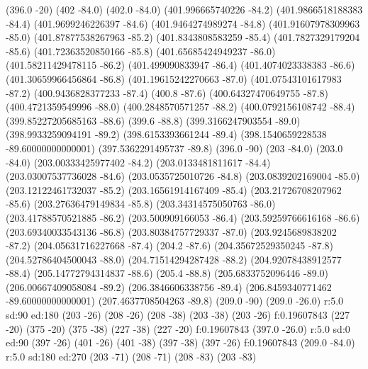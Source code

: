 {\lvec (396.0 -20)
\move (402 -84.0)
\lvec (402.0 -84.0)
\lvec (401.996665740226 -84.2)
\lvec (401.9866518188383 -84.4)
\lvec (401.9699246226397 -84.6)
\lvec (401.9464274989274 -84.8)
\lvec (401.91607978309963 -85.0)
\lvec (401.87877538267963 -85.2)
\lvec (401.8343808583259 -85.4)
\lvec (401.7827329179204 -85.6)
\lvec (401.72363520850166 -85.8)
\lvec (401.65685424949237 -86.0)
\lvec (401.58211429478115 -86.2)
\lvec (401.499090833947 -86.4)
\lvec (401.4074023338383 -86.6)
\lvec (401.30659966456864 -86.8)
\lvec (401.19615242270663 -87.0)
\lvec (401.07543101617983 -87.2)
\lvec (400.9436828377233 -87.4)
\lvec (400.8 -87.6)
\lvec (400.64327470649755 -87.8)
\lvec (400.4721359549996 -88.0)
\lvec (400.2848570571257 -88.2)
\lvec (400.0792156108742 -88.4)
\lvec (399.85227205685163 -88.6)
\lvec (399.6 -88.8)
\lvec (399.3166247903554 -89.0)
\lvec (398.9933259094191 -89.2)
\lvec (398.6153393661244 -89.4)
\lvec (398.1540659228538 -89.60000000000001)
\lvec (397.5362291495737 -89.8)
\lvec (396.0 -90)
\move (203 -84.0)
\lvec (203.0 -84.0)
\lvec (203.00333425977402 -84.2)
\lvec (203.0133481811617 -84.4)
\lvec (203.03007537736028 -84.6)
\lvec (203.0535725010726 -84.8)
\lvec (203.0839202169004 -85.0)
\lvec (203.12122461732037 -85.2)
\lvec (203.16561914167409 -85.4)
\lvec (203.21726708207962 -85.6)
\lvec (203.27636479149834 -85.8)
\lvec (203.34314575050763 -86.0)
\lvec (203.41788570521885 -86.2)
\lvec (203.500909166053 -86.4)
\lvec (203.59259766616168 -86.6)
\lvec (203.69340033543136 -86.8)
\lvec (203.80384757729337 -87.0)
\lvec (203.9245689838202 -87.2)
\lvec (204.05631716227668 -87.4)
\lvec (204.2 -87.6)
\lvec (204.35672529350245 -87.8)
\lvec (204.52786404500043 -88.0)
\lvec (204.71514294287428 -88.2)
\lvec (204.92078438912577 -88.4)
\lvec (205.14772794314837 -88.6)
\lvec (205.4 -88.8)
\lvec (205.6833752096446 -89.0)
\lvec (206.00667409058084 -89.2)
\lvec (206.3846606338756 -89.4)
\lvec (206.8459340771462 -89.60000000000001)
\lvec (207.4637708504263 -89.8)
\lvec (209.0 -90)
\move(209.0 -26.0)
\larc r:5.0 sd:90 ed:180
\move (203 -26)
\lvec (208 -26)
\lvec (208 -38)
\lvec (203 -38)
\lvec (203 -26)
\lfill f:0.19607843
\move (227 -20)
\lvec (375 -20)
\lvec (375 -38)
\lvec (227 -38)
\lvec (227 -20)
\lfill f:0.19607843
\move(397.0 -26.0)
\larc r:5.0 sd:0 ed:90
\move (397 -26)
\lvec (401 -26)
\lvec (401 -38)
\lvec (397 -38)
\lvec (397 -26)
\lfill f:0.19607843
\move(209.0 -84.0)
\larc r:5.0 sd:180 ed:270
\move (203 -71)
\lvec (208 -71)
\lvec (208 -83)
\lvec (203 -83)
}

